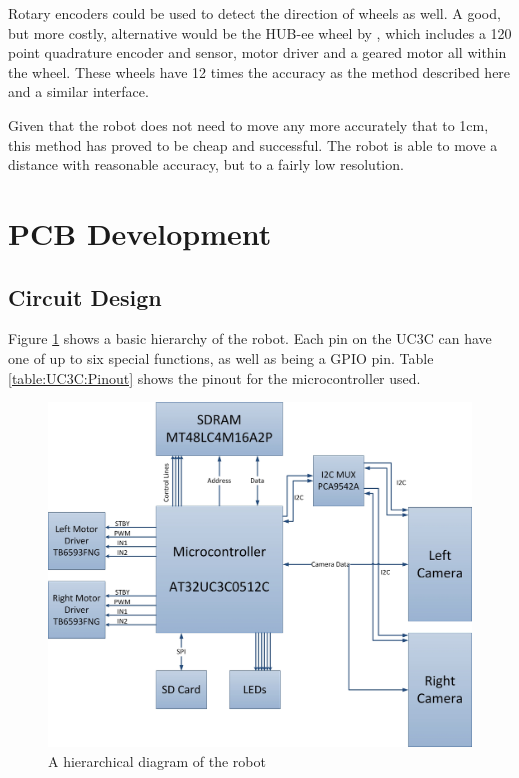 Rotary encoders could be used to detect the direction of wheels as well. A good, but more costly, alternative would be the HUB-ee wheel by \cite{Creative_Robotics}, which includes a 120 point quadrature encoder and sensor, motor driver and a geared motor all within the wheel. These wheels have 12 times the accuracy as the method described here and a similar interface. 
 
Given that the robot does not need to move any more accurately that to 1cm, this method has proved to be cheap and successful. The robot is able to move a distance with reasonable accuracy, but to a fairly low resolution.

\section{PCB Development}\label{Section:PCB_Dev}
\subsection{Circuit Design}

Figure \ref{fig:Hierarchical} shows a basic hierarchy of the robot. Each pin on the UC3C can have one of up to six special functions, as well as being a GPIO pin.  Table \ref{table:UC3C:Pinout} shows the pinout for the microcontroller used. 
\begin{figure}
\includegraphics[width=\textwidth]{Figures/hierarchy.jpg}
\caption{A hierarchical diagram of the robot}
\label{fig:Hierarchical}
\end{figure}


